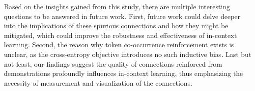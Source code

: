 \documentclass{article} %
\begin{document}
Based on the insights gained from this study, there are multiple interesting questions to be answered in future work. 
First, future work could delve deeper into the implications of these spurious connections and how they might be mitigated, which could improve the robustness and effectiveness of in-context learning. 
Second, the reason why token co-occurrence reinforcement exists is unclear, as the cross-entropy objective introduces no such inductive bias. 
Last but not least, our findings suggest the quality of connections reinforced from demonstrations profoundly influences in-context learning, thus emphasizing the necessity of measurement and visualization of the connections.













\clearpage
\appendix






\end{document}
